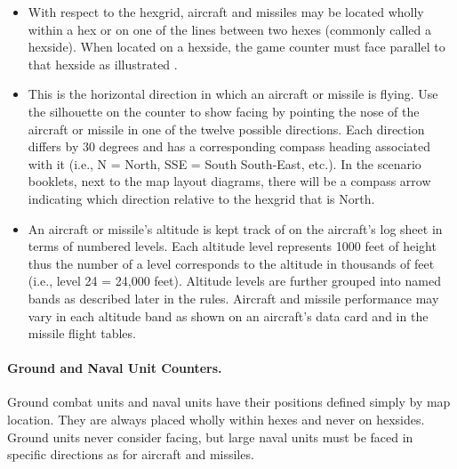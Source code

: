 \begin{itemize}
    \item {} With respect to the hexgrid, aircraft and missiles may be located wholly within a hex or on one of the lines between two hexes (commonly called a hexside). When located on a hexside, the game counter must face parallel to that hexside as illustrated . 

    

    \item {} This is the horizontal direction in which an aircraft or missile is flying. Use the silhouette on the counter to show facing by pointing the nose of the aircraft or missile in one of the twelve possible directions. Each direction differs by 30 degrees and has a corresponding compass heading associated with it (i.e., N = North, SSE = South South-East, etc.). In the scenario booklets, next to the map layout diagrams, there will be a compass arrow indicating which direction relative to the hexgrid that is North. 

    

    \item {} An aircraft or missile's altitude is kept track of on the aircraft's log sheet in terms of numbered levels. Each altitude level represents 1000 feet of height thus the number of a level corresponds to the altitude in thousands of feet (i.e., level 24 = 24,000 feet). Altitude levels are further grouped into named bands as described later in the rules. Aircraft and missile performance may vary in each altitude band as shown on an aircraft's data card and in the missile flight tables.

\end{itemize}

\paragraph{Ground and Naval Unit Counters.} Ground combat units and naval units have their positions defined simply by map location. They are always placed wholly within hexes and never on hexsides. Ground units never consider facing, but large naval units must be faced in specific directions as for aircraft and missiles.

